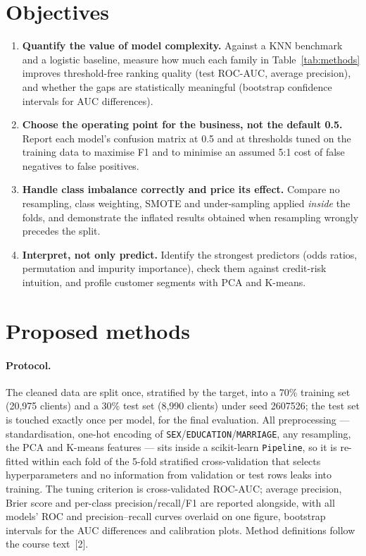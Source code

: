 \documentclass{article}
\begin{document}
\section{Objectives}

\begin{enumerate}
\item \textbf{Quantify the value of model complexity.} Against a KNN benchmark
  and a logistic baseline, measure how much each family in Table~\ref{tab:methods}
  improves threshold-free ranking quality (test ROC-AUC, average precision), and
  whether the gaps are statistically meaningful (bootstrap confidence intervals
  for AUC differences).
\item \textbf{Choose the operating point for the business, not the default 0.5.}
  Report each model's confusion matrix at 0.5 and at thresholds tuned on the
  training data to maximise F1 and to minimise an assumed 5:1 cost of false
  negatives to false positives.
\item \textbf{Handle class imbalance correctly and price its effect.} Compare no
  resampling, class weighting, SMOTE and under-sampling applied \emph{inside} the
  folds, and demonstrate the inflated results obtained when resampling wrongly
  precedes the split.
\item \textbf{Interpret, not only predict.} Identify the strongest predictors
  (odds ratios, permutation and impurity importance), check them against
  credit-risk intuition, and profile customer segments with PCA and K-means.
\end{enumerate}

\section{Proposed methods}

\paragraph{Protocol.}
The cleaned data are split once, stratified by the target, into a 70\% training
set (20,975 clients) and a 30\% test set (8,990 clients) under seed 2607526; the
test set is touched exactly once per model, for the final evaluation. All
preprocessing --- standardisation, one-hot encoding of
\texttt{SEX}/\texttt{EDUCATION}/\texttt{MARRIAGE}, any resampling, the PCA and
K-means features --- sits inside
a scikit-learn \texttt{Pipeline}, so it is re-fitted within each fold of the
5-fold stratified cross-validation that selects hyperparameters and no
information from validation or test rows leaks into training. The tuning
criterion is cross-validated ROC-AUC; average precision, Brier score and
per-class precision/recall/F1 are reported alongside, with all models' ROC and
precision--recall curves overlaid on one figure, bootstrap intervals for the AUC
differences and calibration plots. Method definitions follow the course
text~[2].
\end{document}
